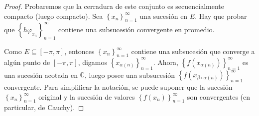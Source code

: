 \documentclass[12pt]{report}
\theoremstyle{largebreak}
\begin{document}
    \begin{proof}
        Probaremos que la cerradura de este conjunto es secuencialmente compacto (luego compacto). Sea $\left\{x_n \right\}_{ n=1}^\infty$ una sucesión en $E$. Hay que probar que $\left\{h\varphi_{ x_n} \right\}_{ n=1}^\infty$ contiene una subsucesión convergente en promedio.

        Como $E\subseteq[-\pi,\pi]$, entonces $\left\{x_n \right\}_{ n=1}^\infty$ contiene una subsucesión que converge a algún punto de $[-\pi,\pi]$, digamos $\left\{x_{\alpha(n)} \right\}_{ n=1}^\infty$. Ahora, $\left\{f(x_{\alpha(n)}) \right\}_{ n=1}^\infty$ es una sucesión acotada en $\mathbb{C}$, luego posee una subsucesión $\left\{f(x_{ \beta\circ\alpha(n)}) \right\}_{ n=1}^\infty$ convergente. Para simplificar la notación, se puede suponer que la sucesión $\left\{x_n\right\}_{ n=1}^\infty$ original y la sucesión de valores $\left\{f(x_n) \right\}_{ n=1}^\infty$ son convergentes (en particular, de Cauchy).


\end{proof}
\end{document}
